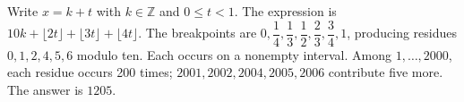Write $x=k+t$ with $k\in\mathbb Z$ and $0\le t<1$. The expression is $10k+\lfloor2t\rfloor+\lfloor3t\rfloor+\lfloor4t\rfloor$. The breakpoints are $0 , \dfrac{1}{4} , \dfrac{1}{3} , \dfrac{1}{2} , \dfrac{2}{3} , \dfrac{3}{4} , 1$, producing residues $0,1,2,4,5,6$ modulo ten. Each occurs on a nonempty interval. Among $1,\ldots,2000$, each residue occurs 200 times; $2001,2002,2004,2005,2006$ contribute five more. The answer is $\boxed{1205}$.
